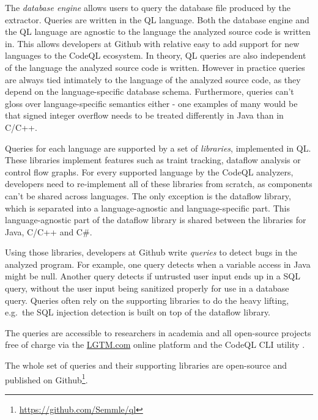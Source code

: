 The \emph{database engine} allows users to query the database file produced by the extractor.
Queries are written in the QL language.
Both the database engine and the QL language are agnostic to the language the analyzed source code 
is written in.
This allows developers at Github with relative easy to add support for new languages to the CodeQL ecosystem.
In theory, QL queries are also independent of the language the analyzed source code is written.
However in practice queries are always tied intimately to the language of the analyzed source code,
as they depend on the language-specific database schema.
Furthermore, queries can't gloss over language-specific semantics either - one examples of many would be
that signed integer overflow needs to be treated differently in Java than in C/C++.

Queries for each language are supported by a set of \emph{libraries}, implemented in QL.
These libraries implement features such as traint tracking, dataflow analysis or control flow graphs.
For every supported language by the CodeQL analyzers, developers need to re-implement all of these libraries from
scratch, as components can't be shared across languages.
The only exception is the dataflow library, which is separated into a language-agnostic and 
language-specific part.
This language-agnostic part of the dataflow library is shared between the libraries for Java, C/C++ and C\#.

Using those libraries, developers at Github  write \emph{queries} to detect bugs in the analyzed program.
For example, one query detects when a variable access in Java might be null.
Another query detects if untrusted user input ends up in a SQL query, without the user input being 
sanitized properly for use in a database query.
Queries often rely on the supporting libraries to do the heavy lifting, e.g.\ the SQL injection detection 
is built on top of the dataflow library.

The queries are accessible to researchers in academia and all open-source projects free of charge 
via the \href{https://LGTM.com}{LGTM.com} online platform and the CodeQL CLI utility . %


The whole set of queries and their supporting libraries are open-source and published on Github\footnote{\url{https://github.com/Semmle/ql}}.


